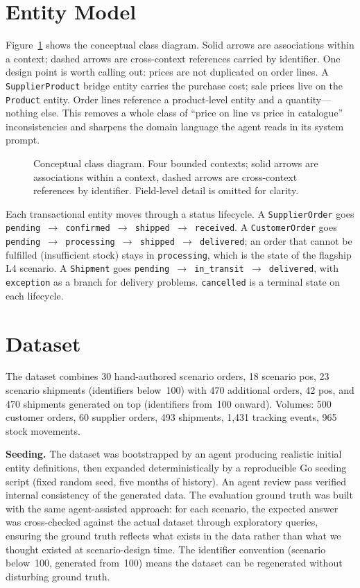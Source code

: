\section{Entity Model}

Figure~\ref{fig:classdiagram} shows the conceptual class diagram. Solid arrows are associations within a context; dashed arrows are cross-context references carried by identifier. One design point is worth calling out: prices are not duplicated on order lines. A \texttt{SupplierProduct} bridge entity carries the purchase cost; sale prices live on the \texttt{Product} entity. Order lines reference a product-level entity and a quantity---nothing else. This removes a whole class of ``price on line vs price in catalogue'' inconsistencies and sharpens the domain language the agent reads in its system prompt.

\begin{figure}[H]
    \centering
    \resizebox{\textwidth}{!}{}
    \caption{Conceptual class diagram. Four bounded contexts; solid arrows are associations within a context, dashed arrows are cross-context references by identifier. Field-level detail is omitted for clarity.}
    \label{fig:classdiagram}
\end{figure}

Each transactional entity moves through a status lifecycle. A \texttt{SupplierOrder} goes \texttt{pending $\to$ confirmed $\to$ shipped $\to$ received}. A \texttt{CustomerOrder} goes \texttt{pending $\to$ processing $\to$ shipped $\to$ delivered}; an order that cannot be fulfilled (insufficient stock) stays in \texttt{processing}, which is the state of the flagship L4 scenario. A \texttt{Shipment} goes \texttt{pending $\to$ in\_transit $\to$ delivered}, with \texttt{exception} as a branch for delivery problems. \texttt{cancelled} is a terminal state on each lifecycle.

\section{Dataset}

The dataset combines 30 hand-authored scenario orders, 18 scenario \gls{po}s, 23 scenario shipments (identifiers below~100) with 470 additional orders, 42 \gls{po}s, and 470 shipments generated on top (identifiers from~100 onward). Volumes: 500 customer orders, 60 supplier orders, 493 shipments, 1{,}431 tracking events, 965 stock movements.

\textbf{Seeding.} The dataset was bootstrapped by an agent producing realistic initial entity definitions, then expanded deterministically by a reproducible Go seeding script (fixed random seed, five months of history). An agent review pass verified internal consistency of the generated data. The evaluation ground truth was built with the same agent-assisted approach: for each scenario, the expected answer was cross-checked against the actual dataset through exploratory queries, ensuring the ground truth reflects what exists in the data rather than what we thought existed at scenario-design time. The identifier convention (scenario below~100, generated from~100) means the dataset can be regenerated without disturbing ground truth.

